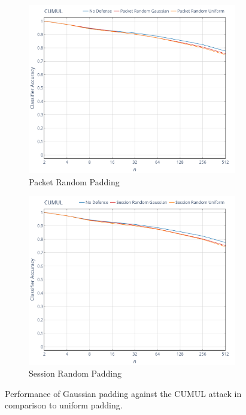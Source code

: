 \documentclass[
	ruledheaders=chapter,
	class=report,
	thesis={type=master, department=inf},
	accentcolor=1c,
	custommargins=true,
	marginpar=false,
	parskip=half-,
	fontsize=11pt,
]{tudapub}
\begin{document}
	\begin{figure}[tbp]
		\begin{subfigure}{0.495\textwidth}
			\centering
			\includegraphics[width=\textwidth]{plots/performance_cumul_pkt.png}
			\caption{Packet Random Padding}
		\end{subfigure}
		\hfill
		\begin{subfigure}{0.495\textwidth}
			\centering
			\includegraphics[width=\textwidth]{plots/performance_cumul_ses.png}
			\caption{Session Random Padding}
		\end{subfigure}
		\caption[Performance of Gaussian padding against the CUMUL attack]{Performance of Gaussian padding against the CUMUL attack \cite{Panchenko2016} in comparison to uniform padding.}
		\label{fig:cumul}
	\end{figure}
\end{document}
